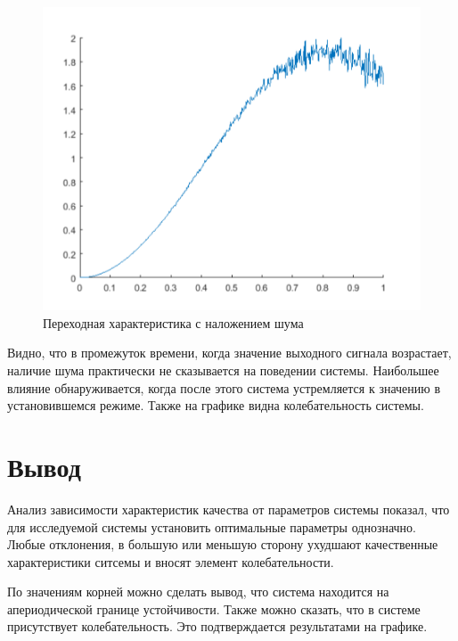 \begin{figure}[h!]
	\centering
	\includegraphics[scale = 0.80]{images/1.png}
	\caption{Переходная характеристика с наложением шума}
	\label{image:9}
\end{figure}
\FloatBarrier


Видно, что в промежуток времени, когда значение выходного сигнала возрастает, наличие шума практически не сказывается на поведении системы. Наибольшее
влияние обнаруживается, когда после этого система устремляется к значению в установившемся режиме. Также на графике видна колебательность системы.

\section{Вывод}

Анализ зависимости характеристик качества от параметров системы показал, что для исследуемой системы установить оптимальные параметры однозначно. Любые отклонения, в большую или меньшую сторону ухудшают качественные характеристики ситсемы и вносят элемент колебательности. 

По значениям корней можно сделать вывод, что система находится на апериодической границе
устойчивости. Также можно сказать, что в системе присутствует колебательность. Это
подтверждается результатами на графике.



